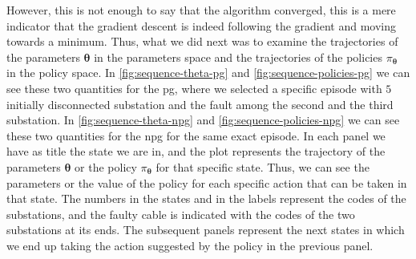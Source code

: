 However, this is not enough to say that the algorithm converged, this is a mere indicator that the gradient descent is indeed following the gradient and moving towards a minimum. Thus, what we did next was to examine the trajectories of the parameters $\boldsymbol \theta$ in the parameters space and the trajectories of the policies $\pi_{\boldsymbol \theta}$ in the policy space. In \autoref{fig:sequence-theta-pg} and \autoref{fig:sequence-policies-pg} we can see these two quantities for the \acrshort{pg}, where we selected a specific episode with $5$ initially disconnected substation and the fault among the second and the third substation. In \autoref{fig:sequence-theta-npg} and \autoref{fig:sequence-policies-npg} we can see these two quantities for the \acrshort{npg} for the same exact episode. In each panel we have as title the state we are in, and the plot represents the trajectory of the parameters $\boldsymbol \theta$ or the policy $\pi_{\boldsymbol \theta}$ for that specific state. Thus, we can see the parameters or the value of the policy for each specific action that can be taken in that state. The numbers in the states and in the labels represent the codes of the substations, and the faulty cable is indicated with the codes of the two substations at its ends. The subsequent panels represent the next states in which we end up taking the action suggested by the policy in the previous panel.

